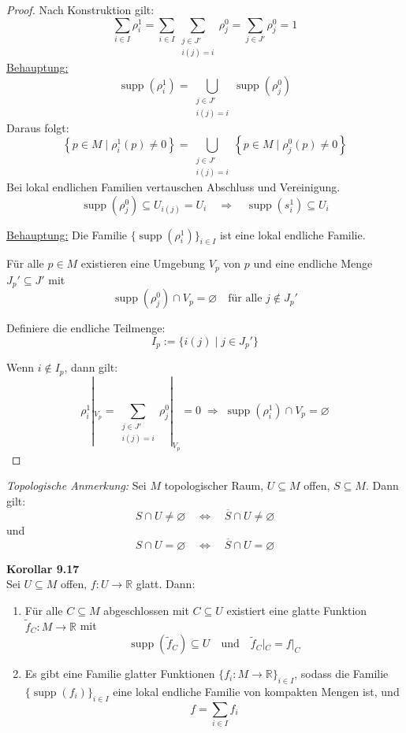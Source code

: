 \documentclass[fleqn, 12pt, letterpaper]{article}
\begin{document}
\begin{proof}
Nach Konstruktion gilt:
\[
\sum_{i \in I} \rho_i^1 
= \sum_{i \in I} \sum_{\substack{j \in J' \\ i(j) = i}} \rho_j^0 
= \sum_{j \in J'} \rho_j^0 
= 1
\]
\underline{Behauptung:} 
\[
\operatorname{supp}(\rho_i^1) = \bigcup_{\substack{j \in J' \\ i(j) = i}} \operatorname{supp}(\rho_j^0)
\]
Daraus folgt:
\[
\left\{ p \in M \mid \rho_i^1(p) \neq 0 \right\} = \bigcup_{\substack{j \in J' \\ i(j) = i}} \left\{ p \in M \mid \rho_j^0(p) \neq 0 \right\}
\]
{Bei lokal endlichen Familien vertauschen Abschluss und Vereinigung.}
\[
\operatorname{supp}(\rho_j^0) \subseteq U_{i(j)} = U_i \quad \Rightarrow \quad \operatorname{supp}(s_i^1) \subseteq U_i
\]

\underline{Behauptung:} Die Familie $\{\operatorname{supp}(\rho_i^1)\}_{i \in I}$ ist eine lokal endliche Familie.

\medskip

Für alle $p \in M$ existieren eine Umgebung $V_p$ von $p$ und eine endliche Menge $J_p' \subseteq J'$ mit
\[
\operatorname{supp}(\rho_j^0) \cap V_p = \varnothing \quad \text{für alle } j \notin J_p'
\]

Definiere die endliche Teilmenge:
\[
I_p := \{ i(j) \mid j \in J_p' \}
\]

Wenn $i \notin I_p$, dann gilt:
\[
\rho_i^1|_{V_p} = \sum_{\substack{j \in J' \\ i(j) = i}} \rho_j^0|_{V_p} = 0  \;\Rightarrow \;\operatorname{supp}(\rho_i^1) \cap V_p = \varnothing 
\]
\end{proof}

\textit{Topologische Anmerkung:} Sei $M$ topologischer Raum, $U \subseteq M$ offen, $S \subseteq M$. Dann gilt:
\[
S \cap U \neq \varnothing \quad \Longleftrightarrow \quad \overline{S} \cap U \neq \varnothing
\]
und
\[
S \cap U = \varnothing \quad \Longleftrightarrow \quad \overline{S} \cap U = \varnothing
\]

\textbf{Korollar 9.17}\\
Sei $U \subseteq M$ offen, $f \colon U \to \mathbb{R}$ glatt. Dann:
\begin{enumerate}
    \item Für alle $C \subseteq M$ abgeschlossen mit $C \subseteq U$ existiert eine glatte Funktion $\tilde{f}_C \colon M \to \mathbb{R}$ mit
    \[
    \operatorname{supp}(\tilde{f}_C) \subseteq U \quad \text{und} \quad \tilde{f}_C|_C = f|_C
    \]

    \item Es gibt eine Familie glatter Funktionen $\{f_i \colon M \to \mathbb{R}\}_{i \in I}$, sodass die Familie $\{ \operatorname{supp}(f_i) \}_{i \in I}$ eine lokal endliche Familie von kompakten Mengen ist, und
    \[
    f = \sum_{i \in I} f_i
    \]
\end{enumerate}
\end{document}
